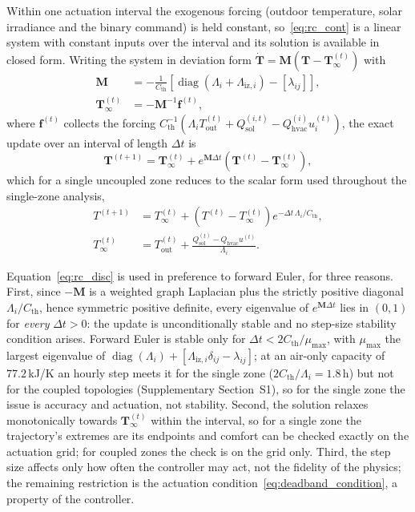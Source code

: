 \documentclass[pdflatex,sn-mathphys-num,iicol]{sn-jnl}
\theoremstyle{thmstyleone}\newtheorem{proposition}{Proposition}\newtheorem{corollary}{Corollary}
\theoremstyle{thmstyletwo}\newtheorem{remark}{Remark}\newtheorem{observation}{Observation}
\theoremstyle{thmstylethree}\newtheorem{definition}{Definition}
\newcommand{\Tout}{T_{\mathrm{out}}}
\newcommand{\Cth}{C_{\mathrm{th}}}
\newcommand{\lij}{\lambda_{ij}}
\newcommand{\Qhvac}{Q_{\mathrm{hvac}}}
\newcommand{\Liz}[1]{\Lambda_{\mathrm{iz},#1}}
\begin{document}
Within one actuation interval the exogenous forcing (outdoor temperature, solar irradiance and the binary command) is held constant, so~\eqref{eq:rc_cont} is a linear system with constant inputs over the interval and its solution is available in closed form. Writing the system in deviation form $\dot{\mathbf{T}}=\mathbf{M}\!\left(\mathbf{T}-\mathbf{T}_\infty^{(t)}\right)$ with
\begin{equation}
\begin{aligned}
  \mathbf{M}&=-\tfrac{1}{\Cth}\!\left[\operatorname{diag}\!\left(\Lambda_i+\Liz{i}\right)-\left[\lij\right]\right],\\
  \mathbf{T}_\infty^{(t)}&=-\mathbf{M}^{-1}\mathbf{f}^{(t)},
\end{aligned}
  \label{eq:rc_matrix}
\end{equation}
where $\mathbf{f}^{(t)}$ collects the forcing $\Cth^{-1}\!\left(\Lambda_i\Tout^{(t)}+Q_{\mathrm{sol}}^{(i,t)}-\Qhvac^{(i)}u_i^{(t)}\right)$, the exact update over an interval of length $\Delta t$ is
\begin{equation}
  \mathbf{T}^{(t+1)}
  =\mathbf{T}_\infty^{(t)}
  +e^{\mathbf{M}\Delta t}\!\left(\mathbf{T}^{(t)}-\mathbf{T}_\infty^{(t)}\right),
  \label{eq:rc_disc}
\end{equation}
which for a single uncoupled zone reduces to the scalar form used throughout the single-zone analysis,
\begin{equation}
\begin{aligned}
  T^{(t+1)}&=T_\infty^{(t)}+\left(T^{(t)}-T_\infty^{(t)}\right)e^{-\Delta t\,\Lambda_i/\Cth},\\
  T_\infty^{(t)}&=\Tout^{(t)}+\frac{Q_{\mathrm{sol}}^{(t)}-\Qhvac u^{(t)}}{\Lambda_i}.
\end{aligned}
  \label{eq:rc_scalar}
\end{equation}

Equation~\eqref{eq:rc_disc} is used in preference to forward Euler, for three reasons. First, since $-\mathbf{M}$ is a weighted graph Laplacian plus the strictly positive diagonal $\Lambda_i/\Cth$, hence symmetric positive definite, every eigenvalue of $e^{\mathbf{M}\Delta t}$ lies in $(0,1)$ for \emph{every} $\Delta t>0$: the update is unconditionally stable and no step-size stability condition arises. Forward Euler is stable only for $\Delta t<2\Cth/\mu_{\max}$, with $\mu_{\max}$ the largest eigenvalue of $\operatorname{diag}(\Lambda_i)+[\Liz{i}\delta_{ij}-\lij]$; at an air-only capacity of $77.2\,$kJ/K an hourly step meets it for the single zone ($2\Cth/\Lambda_i=1.8\,$h) but not for the coupled topologies (Supplementary Section~S1), so for the single zone the issue is accuracy and actuation, not stability. Second, the solution relaxes monotonically towards $\mathbf{T}_\infty^{(t)}$ within the interval, so for a single zone the trajectory's extremes are its endpoints and comfort can be checked exactly on the actuation grid; for coupled zones the check is on the grid only. Third, the step size affects only how often the controller may act, not the fidelity of the physics; the remaining restriction is the actuation condition~\eqref{eq:deadband_condition}, a property of the controller.
\end{document}
